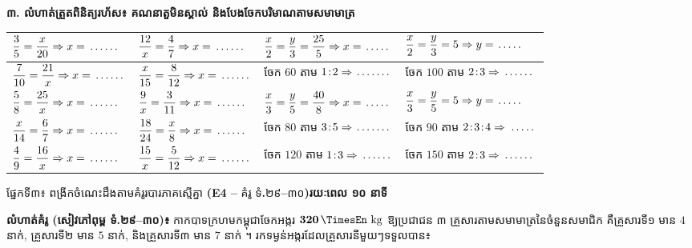 \documentclass[a4paper,10pt]{article}
\newcommand{\en}[1]{{\TimesEn #1}}
\newcommand{\enbf}[1]{{\TimesEn\bfseries #1}}
\newcommand{\unit}[1]{\,\text{\en{#1}}}
\newcommand{\blank}[1][1.5cm]{\makebox[#1]{\dotfill}}
\newcommand{\secbar}[2]{%
  \begin{tcolorbox}[enhanced, sharp corners, colback=headgray, colframe=black, boxrule=0.9pt, boxsep=1pt, top=2pt, bottom=2pt, left=5pt, right=5pt, before skip=4pt, after skip=3pt]
    {\muol\fontsize{9.2pt}{13pt}\selectfont #1}\hfill{\fontsize{8pt}{11pt}\selectfont\textbf{#2}}
  \end{tcolorbox}%
}
\begin{document}
\vspace{3pt}
\textbf{៣. លំហាត់ត្រួតពិនិត្យរហ័ស៖ គណនាតួមិនស្គាល់ និងបែងចែកបរិមាណតាមសមាមាត្រ}

\vspace{2pt}
{\renewcommand{\arraystretch}{1.64}
\begin{tabular}{|C{4.40cm}|C{4.40cm}|C{4.40cm}|C{4.40cm}|}
  \hline
  $\dfrac{3}{5} = \dfrac{x}{20} \Rightarrow x = \blank[1.0cm]$ & $\dfrac{12}{x} = \dfrac{4}{7} \Rightarrow x = \blank[1.0cm]$ & $\dfrac{x}{2}=\dfrac{y}{3}=\dfrac{25}{5} \Rightarrow x=\blank[0.8cm]$ & $\dfrac{x}{2}=\dfrac{y}{3}=5 \Rightarrow y=\blank[0.8cm]$ \\
  \hline
  $\dfrac{7}{10} = \dfrac{21}{x} \Rightarrow x = \blank[1.0cm]$ & $\dfrac{x}{15} = \dfrac{8}{12} \Rightarrow x = \blank[1.0cm]$ & ចែក $60$ តាម $1\!:\!2 \Rightarrow \blank[1.1cm]$ & ចែក $100$ តាម $2\!:\!3 \Rightarrow \blank[1.0cm]$ \\
  \hline
  $\dfrac{5}{8} = \dfrac{25}{x} \Rightarrow x = \blank[1.0cm]$ & $\dfrac{9}{x} = \dfrac{3}{11} \Rightarrow x = \blank[1.0cm]$ & $\dfrac{x}{3}=\dfrac{y}{5}=\dfrac{40}{8} \Rightarrow x=\blank[0.8cm]$ & $\dfrac{x}{3}=\dfrac{y}{5}=5 \Rightarrow y=\blank[0.8cm]$ \\
  \hline
  $\dfrac{x}{14} = \dfrac{6}{7} \Rightarrow x = \blank[1.0cm]$ & $\dfrac{18}{24} = \dfrac{x}{8} \Rightarrow x = \blank[1.0cm]$ & ចែក $80$ តាម $3\!:\!5 \Rightarrow \blank[1.1cm]$ & ចែក $90$ តាម $2\!:\!3\!:\!4 \Rightarrow \blank[0.9cm]$ \\
  \hline
  $\dfrac{4}{9} = \dfrac{16}{x} \Rightarrow x = \blank[1.0cm]$ & $\dfrac{15}{x} = \dfrac{5}{12} \Rightarrow x = \blank[1.0cm]$ & ចែក $120$ តាម $1\!:\!3 \Rightarrow \blank[1.0cm]$ & ចែក $150$ តាម $2\!:\!3 \Rightarrow \blank[1.0cm]$ \\
  \hline
\end{tabular}}

\newpage

\secbar{ផ្នែកទី៣៖ ពង្រីកចំណេះដឹងតាមគំរូរបារភាគស្មើគ្នា \enbf{(E4 --} គំរូ ទំ\enbf{.}២៩\enbf{--}៣០\enbf{)}}{រយៈពេល ១០ នាទី}

\textbf{លំហាត់គំរូ (សៀវភៅពុម្ព ទំ.២៩–៣០)៖} កាកបាទក្រហមកម្ពុជាចែកអង្ករ $\mathbf{320\unit{kg}}$ ឱ្យប្រជាជន ៣ គ្រួសារតាមសមាមាត្រនៃចំនួនសមាជិក គឺគ្រួសារទី១ មាន $4$ នាក់, គ្រួសារទី២ មាន $5$ នាក់, និងគ្រួសារទី៣ មាន $7$ នាក់ ។ រកទម្ងន់អង្ករដែលគ្រួសារនីមួយៗទទួលបាន៖
\end{document}
